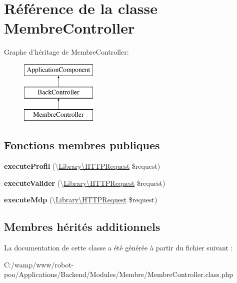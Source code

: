 \hypertarget{class_applications_1_1_backend_1_1_modules_1_1_membre_1_1_membre_controller}{\section{Référence de la classe Membre\+Controller}
\label{class_applications_1_1_backend_1_1_modules_1_1_membre_1_1_membre_controller}
}
Graphe d'héritage de Membre\+Controller\+:\begin{figure}[H]
\begin{center}
\leavevmode
\includegraphics[height=3.000000cm]{class_applications_1_1_backend_1_1_modules_1_1_membre_1_1_membre_controller}
\end{center}
\end{figure}
\subsection*{Fonctions membres publiques}
\begin{DoxyCompactItemize}
\item 
\hypertarget{class_applications_1_1_backend_1_1_modules_1_1_membre_1_1_membre_controller_ab9b517c27ff1888c3c90d0df5af9b652}{{\bfseries execute\+Profil} (\textbackslash{}\hyperlink{class_library_1_1_h_t_t_p_request}{Library\textbackslash{}\+H\+T\+T\+P\+Request} \$request)}\label{class_applications_1_1_backend_1_1_modules_1_1_membre_1_1_membre_controller_ab9b517c27ff1888c3c90d0df5af9b652}

\item 
\hypertarget{class_applications_1_1_backend_1_1_modules_1_1_membre_1_1_membre_controller_af8f245be54fe96af6ad868119119ff1e}{{\bfseries execute\+Valider} (\textbackslash{}\hyperlink{class_library_1_1_h_t_t_p_request}{Library\textbackslash{}\+H\+T\+T\+P\+Request} \$request)}\label{class_applications_1_1_backend_1_1_modules_1_1_membre_1_1_membre_controller_af8f245be54fe96af6ad868119119ff1e}

\item 
\hypertarget{class_applications_1_1_backend_1_1_modules_1_1_membre_1_1_membre_controller_aa5c1466507846bfbb60656685c817291}{{\bfseries execute\+Mdp} (\textbackslash{}\hyperlink{class_library_1_1_h_t_t_p_request}{Library\textbackslash{}\+H\+T\+T\+P\+Request} \$request)}\label{class_applications_1_1_backend_1_1_modules_1_1_membre_1_1_membre_controller_aa5c1466507846bfbb60656685c817291}

\end{DoxyCompactItemize}
\subsection*{Membres hérités additionnels}


La documentation de cette classe a été générée à partir du fichier suivant \+:\begin{DoxyCompactItemize}
\item 
C\+:/wamp/www/robot-\/poo/\+Applications/\+Backend/\+Modules/\+Membre/Membre\+Controller.\+class.\+php\end{DoxyCompactItemize}
